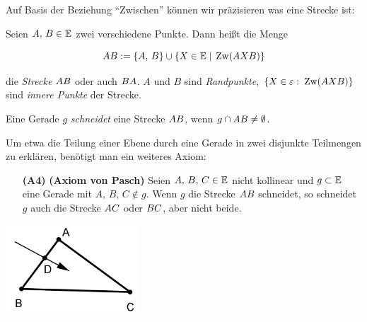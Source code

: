 
Auf Basis der Beziehung "`Zwischen"' können wir präzisieren was eine Strecke ist:

\begin{defi}[Strecke]
    Seien $A,\,B\in \mathbb E$ zwei verschiedene Punkte. Dann heißt die Menge

    $$
    {AB}:=\{A,\,B\}\cup\{X\in\mathbb E \; | \;\operatorname{Zw}(AXB)\}
    $$

    die {\em Strecke} ${AB}$ oder auch ${BA}$. $A$ und $B$ sind {\em Randpunkte}, $\{X \in
    \varepsilon:\; \operatorname{Zw}(AXB)\}$ sind {\em innere Punkte} der Strecke.
\end{defi}

Eine Gerade $g$ \emph{schneidet} eine Strecke ${AB}$, wenn $g\cap{AB}\neq \emptyset$.

Um etwa die Teilung einer Ebene durch eine Gerade in zwei disjunkte Teilmengen
zu erklären, benötigt man ein weiteres Axiom:


\begin{enumerate}
    \item[{\bf (A4)}] {\bf (Axiom von Pasch)} Seien $A,\,B,\,C\in\mathbb E$ nicht kollinear und
        $g\subset\mathbb E$ eine Gerade mit $A,\,B,\,C\notin g$. Wenn $g$ die Strecke ${AB}$ schneidet,
        so schneidet $g$ auch die Strecke ${AC}$ oder ${BC}$, aber nicht beide.
\end{enumerate}


\centerline{\includegraphics[width=5cm]{BILDER/1-1-04-Pasch.png}}

